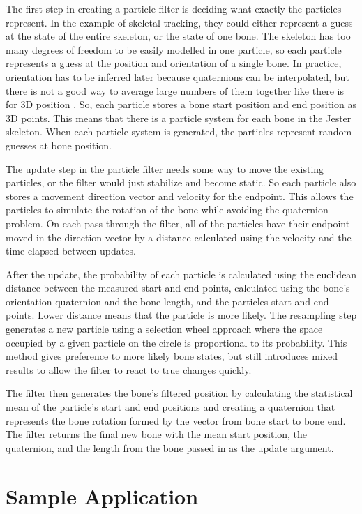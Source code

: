 The first step in creating a particle filter is deciding what exactly the particles represent. In the example of skeletal tracking, they could either represent a guess at the state of the entire skeleton, or the state of one bone. The skeleton has too many degrees of freedom to be easily modelled in one particle, so each particle represents a guess at the position and orientation of a single bone. In practice, orientation has to be inferred later because quaternions can be interpolated, but there is not a good way to average large numbers of them together like there is for 3D position \cite{markley2007averaging}. So, each particle stores a bone start position and end position as 3D points. This means that there is a particle system for each bone in the Jester skeleton. When each particle system is generated, the particles represent random guesses at bone position. 

The update step in the particle filter needs some way to move the existing particles, or the filter would just stabilize and become static. So each particle also stores a movement direction vector and velocity for the endpoint. This allows the particles to simulate the rotation of the bone while avoiding the quaternion problem. On each pass through the filter, all of the particles have their endpoint moved in the direction vector by a distance calculated using the velocity and the time elapsed between updates.

After the update, the probability of each particle is calculated using the euclidean distance between the measured start and end points, calculated using the bone's orientation quaternion and the bone length, and the particles start and end points. Lower distance means that the particle is more likely. The resampling step generates a new particle using a selection wheel approach where the space occupied by a given particle on the circle is proportional to its probability. This method gives preference to more likely bone states, but still introduces mixed results to allow the filter to react to true changes quickly.

The filter then generates the bone's filtered position by calculating the statistical mean of the particle's start and end positions and creating a quaternion that represents the bone rotation formed by the vector from bone start to bone end. The filter returns the final new bone with the mean start position, the quaternion, and the length from the bone passed in as the update argument. 

\section{Sample Application}\label{sec:app_impl}

